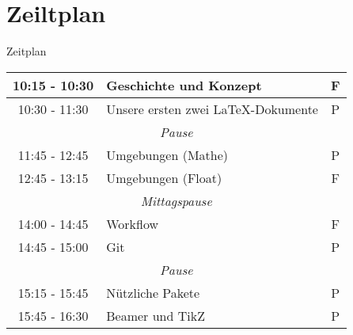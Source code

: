 \documentclass[11pt]{beamer}
\begin{document}
\section{Zeiltplan}
\begin{frame}[fragile]{Zeitplan}
\small{
	\begin{table}
	\centering
	\begin{tabular}{c|l|c}
	\toprule
	10:15 - 10:30 & Geschichte und Konzept & F\\
	\midrule
	10:30 - 11:30 & Unsere ersten zwei \LaTeX -Dokumente & P\\
	\midrule
	\multicolumn{3}{c}{\textit{Pause}}\\
	\midrule
	11:45 - 12:45 & Umgebungen (Mathe) & P\\
	\midrule
	12:45 - 13:15 & Umgebungen (Float) & F\\
	\midrule
	\multicolumn{3}{c}{\textit{Mittagspause}}\\
	\midrule
	14:00 - 14:45 & Workflow & F\\
	\midrule
	14:45 - 15:00 & Git & P\\
	\midrule
	\multicolumn{3}{c}{\textit{Pause}}\\
	\midrule
	15:15 - 15:45 & Nützliche Pakete & P\\
	\midrule
	15:45 - 16:30 & Beamer und TikZ & P\\
	\bottomrule
	\end{tabular}
	\end{table}
}
\end{frame}
\end{document}
